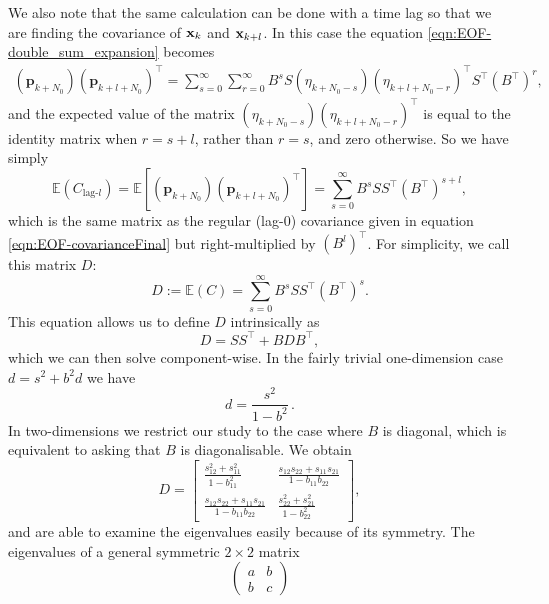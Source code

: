 We also note that the same calculation can be done with a time lag so that we are finding the covariance of $\mathbf{x}_k$ and $\mathbf{x}_{k+l}$. In this case the equation \ref{eqn:EOF-double_sum_expansion} becomes
\begin{align}
(\mathbf{p}_{k+N_0})(\mathbf{p}_{k+l+N_0})^\top = \sum_{s=0}^\infty \sum_{r=0}^\infty B^s S(\eta_{k+N_0-s})(\eta_{k+l+N_0-r})^\top S^\top (B^\top)^r,
\end{align}
and the expected value of the matrix $(\eta_{k+N_0-s})(\eta_{k+l+N_0-r})^\top$ is equal to the identity matrix when $r = s+l$, rather than $r=s$, and zero otherwise. So we have simply 
\begin{equation}
\mathbb{E}(C_{\text{lag-}l}) = \mathbb{E}\left[(\mathbf{p}_{k+N_0})(\mathbf{p}_{k+l+N_0})^\top\right] = \sum_{s=0}^\infty B^s S S^\top (B^\top)^{s+l},
\end{equation}
which is the same matrix as the regular (lag-0) covariance given in equation \ref{eqn:EOF-covarianceFinal} but right-multiplied by $(B^l)^\top$. For simplicity, we call this matrix $D$:
\begin{equation}
D:=\mathbb{E}(C) = \sum_{s=0}^\infty B^s S S^\top (B^\top)^s.
\end{equation}
This equation allows us to define $D$ intrinsically as
\begin{equation}
D = SS^\top + B D B^\top,
\end{equation}
which we can then solve component-wise. In the fairly trivial one-dimension case $d=s^2+b^2d$ we have 
\begin{equation}
d = \frac{s^2 }{1-b^2}\,.
\end{equation}
In two-dimensions we restrict our study to the case where $B$ is diagonal, which is equivalent to asking that $B$ is diagonalisable. We obtain
\begin{equation}
	D = \left[ 
	\begin{array}{cc}
	\frac{s_{12}^2+s_{11}^2}{1-b_{11}^2} & \frac{s_{12}s_{22}+s_{11}s_{21}}{1-b_{11}b_{22}}\\
	\frac{s_{12}s_{22}+s_{11}s_{21}}{1-b_{11}b_{22}} & \frac{s_{22}^2+s_{21}^2}{1-b_{22}^2}
	\end{array}
	\right],
\label{eqn:2D:B_diag}
\end{equation}
and are able to examine the eigenvalues easily because of its symmetry. The eigenvalues of a general symmetric $2\times 2$ matrix 
\begin{equation}
\left(
\begin{array}{cc}
a&b\\
b&c
\end{array}
\right)
\end{equation}
